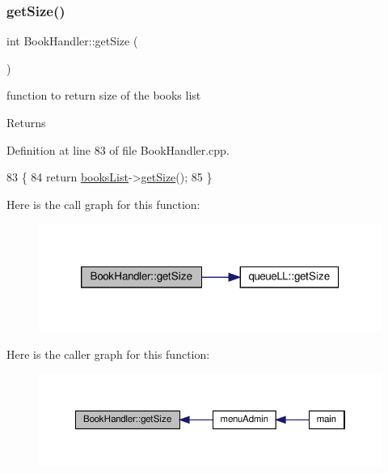 \subsubsection{\texorpdfstring{get\+Size()}{getSize()}}
{\footnotesize\ttfamily int Book\+Handler\+::get\+Size (\begin{DoxyParamCaption}{ }\end{DoxyParamCaption})}

function to return size of the books list \begin{DoxyReturn}{Returns}

\end{DoxyReturn}


Definition at line 83 of file Book\+Handler.\+cpp.


\begin{DoxyCode}
83                          \{
84     \textcolor{keywordflow}{return} \hyperlink{class_book_handler_a13a6c78422b3ad7acd5ebdb9555a0286}{booksList}->\hyperlink{classqueue_l_l_a8969feebcb563f0b489bc112422b9563}{getSize}();
85 \}
\end{DoxyCode}
Here is the call graph for this function\+:
\nopagebreak
\begin{figure}[H]
\begin{center}
\leavevmode
\includegraphics[width=320pt]{class_book_handler_a2939194b5d19618d5a69743b4c0dc240_cgraph}
\end{center}
\end{figure}
Here is the caller graph for this function\+:
\nopagebreak
\begin{figure}[H]
\begin{center}
\leavevmode
\includegraphics[width=350pt]{class_book_handler_a2939194b5d19618d5a69743b4c0dc240_icgraph}
\end{center}
\end{figure}
\mbox{\label{class_book_handler_ac6e2d4211b55e636348daaa9253a2d12}} 
